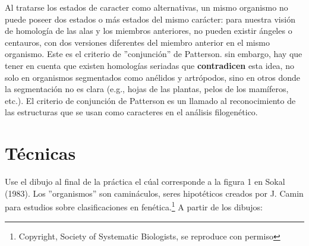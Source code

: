 Al tratarse los estados de caracter como alternativas, un mismo organismo no puede poseer dos estados o m\'as estados del mismo car\'acter: para nuestra visi\'on de homolog\'ia de las alas y los miembros anteriores, no pueden existir \'angeles o centauros, con dos versiones diferentes del miembro anterior en el mismo organismo. Este es el criterio de ''conjunci\'on'' de Patterson. sin embargo, hay que tener en cuenta que existen homolog\'ias seriadas que \textbf{contradicen} esta idea, no solo en organismos segmentados como an\'elidos y artr\'opodos, sino en otros donde la segmentaci\'on no es clara (e.g., hojas de las plantas, pelos de los mam\'iferos, etc.). El criterio de conjunci\'on de Patterson es un llamado al reconocimiento de las estructuras que se usan como caracteres en el an\'alisis filogen\'etico.


\section*{T\'ecnicas}


Use el dibujo al final de la pr\'actica el c\'ual corresponde a la figura 1 en Sokal (1983). 
Los ''organismos'' son camin\'aculos, seres hipot\'eticos creados por J. Camin para estudios sobre clasificaciones en fen\'etica.\footnote{Copyright, Society of Systematic Biologists, se reproduce con permiso} A partir de los dibujos:




